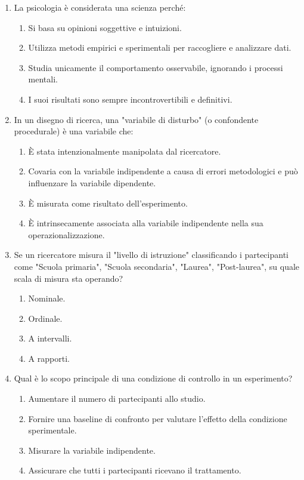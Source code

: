 \documentclass[12pt, a4paper]{article}
\begin{document}
\begin{enumerate}[resume]
    \item La psicologia è considerata una scienza perché:
    \begin{enumerate}
        \item Si basa su opinioni soggettive e intuizioni.
        \item Utilizza metodi empirici e sperimentali per raccogliere e analizzare dati.
        \item Studia unicamente il comportamento osservabile, ignorando i processi mentali.
        \item I suoi risultati sono sempre incontrovertibili e definitivi.
    \end{enumerate}
    \vspace{0.3cm}

    \item In un disegno di ricerca, una "variabile di disturbo" (o confondente procedurale) è una variabile che:
    \begin{enumerate}
        \item È stata intenzionalmente manipolata dal ricercatore.
        \item Covaria con la variabile indipendente a causa di errori metodologici e può influenzare la variabile dipendente.
        \item È misurata come risultato dell'esperimento.
        \item È intrinsecamente associata alla variabile indipendente nella sua operazionalizzazione.
    \end{enumerate}
    \vspace{0.3cm}

    \item Se un ricercatore misura il "livello di istruzione" classificando i partecipanti come "Scuola primaria", "Scuola secondaria", "Laurea", "Post-laurea", su quale scala di misura sta operando?
    \begin{enumerate}
        \item Nominale.
        \item Ordinale.
        \item A intervalli.
        \item A rapporti.
    \end{enumerate}
    \vspace{0.3cm}

    \item Qual è lo scopo principale di una condizione di controllo in un esperimento?
    \begin{enumerate}
        \item Aumentare il numero di partecipanti allo studio.
        \item Fornire una baseline di confronto per valutare l'effetto della condizione sperimentale.
        \item Misurare la variabile indipendente.
        \item Assicurare che tutti i partecipanti ricevano il trattamento.
    \end{enumerate}
    \vspace{0.3cm}


\end{enumerate}
\end{document}
